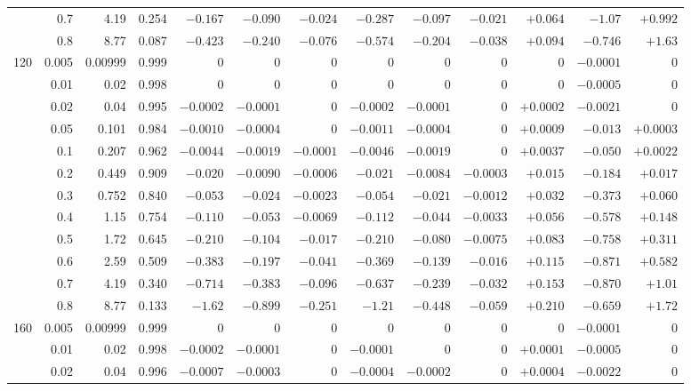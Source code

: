 \documentclass[11pt,a4paper]{article}
\begin{document}
\begin{table}[htbp]
\begin{tabular}{rrrrrrrrrrrrr}
 & 0.7 & 4.19 & 0.254 & $-0.167$ & $-0.090$ & $-0.024$ & $-0.287$ & $-0.097$ & $-0.021$ & $+0.064$ & $-1.07$ & $+0.992$ \\
 & 0.8 & 8.77 & 0.087 & $-0.423$ & $-0.240$ & $-0.076$ & $-0.574$ & $-0.204$ & $-0.038$ & $+0.094$ & $-0.746$ & $+1.63$ \\
\midrule
120 & 0.005 & 0.00999 & 0.999 & $0$ & $0$ & $0$ & $0$ & $0$ & $0$ & $0$ & $-0.0001$ & $0$ \\
 & 0.01 & 0.02 & 0.998 & $0$ & $0$ & $0$ & $0$ & $0$ & $0$ & $0$ & $-0.0005$ & $0$ \\
 & 0.02 & 0.04 & 0.995 & $-0.0002$ & $-0.0001$ & $0$ & $-0.0002$ & $-0.0001$ & $0$ & $+0.0002$ & $-0.0021$ & $0$ \\
 & 0.05 & 0.101 & 0.984 & $-0.0010$ & $-0.0004$ & $0$ & $-0.0011$ & $-0.0004$ & $0$ & $+0.0009$ & $-0.013$ & $+0.0003$ \\
 & 0.1 & 0.207 & 0.962 & $-0.0044$ & $-0.0019$ & $-0.0001$ & $-0.0046$ & $-0.0019$ & $0$ & $+0.0037$ & $-0.050$ & $+0.0022$ \\
 & 0.2 & 0.449 & 0.909 & $-0.020$ & $-0.0090$ & $-0.0006$ & $-0.021$ & $-0.0084$ & $-0.0003$ & $+0.015$ & $-0.184$ & $+0.017$ \\
 & 0.3 & 0.752 & 0.840 & $-0.053$ & $-0.024$ & $-0.0023$ & $-0.054$ & $-0.021$ & $-0.0012$ & $+0.032$ & $-0.373$ & $+0.060$ \\
 & 0.4 & 1.15 & 0.754 & $-0.110$ & $-0.053$ & $-0.0069$ & $-0.112$ & $-0.044$ & $-0.0033$ & $+0.056$ & $-0.578$ & $+0.148$ \\
 & 0.5 & 1.72 & 0.645 & $-0.210$ & $-0.104$ & $-0.017$ & $-0.210$ & $-0.080$ & $-0.0075$ & $+0.083$ & $-0.758$ & $+0.311$ \\
 & 0.6 & 2.59 & 0.509 & $-0.383$ & $-0.197$ & $-0.041$ & $-0.369$ & $-0.139$ & $-0.016$ & $+0.115$ & $-0.871$ & $+0.582$ \\
 & 0.7 & 4.19 & 0.340 & $-0.714$ & $-0.383$ & $-0.096$ & $-0.637$ & $-0.239$ & $-0.032$ & $+0.153$ & $-0.870$ & $+1.01$ \\
 & 0.8 & 8.77 & 0.133 & $-1.62$ & $-0.899$ & $-0.251$ & $-1.21$ & $-0.448$ & $-0.059$ & $+0.210$ & $-0.659$ & $+1.72$ \\
\midrule
160 & 0.005 & 0.00999 & 0.999 & $0$ & $0$ & $0$ & $0$ & $0$ & $0$ & $0$ & $-0.0001$ & $0$ \\
 & 0.01 & 0.02 & 0.998 & $-0.0002$ & $-0.0001$ & $0$ & $-0.0001$ & $0$ & $0$ & $+0.0001$ & $-0.0005$ & $0$ \\
 & 0.02 & 0.04 & 0.996 & $-0.0007$ & $-0.0003$ & $0$ & $-0.0004$ & $-0.0002$ & $0$ & $+0.0004$ & $-0.0022$ & $0$ \\

\end{tabular}
\end{table}
\end{document}
